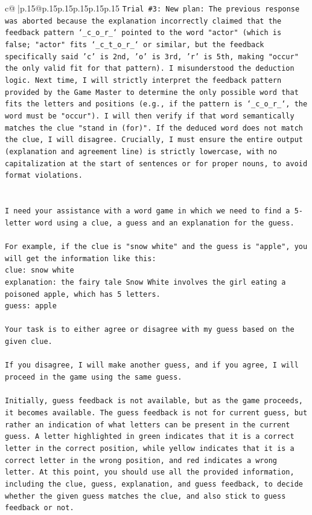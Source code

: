 \documentclass{article}
\begin{document}
{\begin{supertabular}{c@{$\;$}|p{.15\linewidth}@{}p{.15\linewidth}p{.15\linewidth}p{.15\linewidth}p{.15\linewidth}p{.15\linewidth}}
{{{\texttt{Trial \#3: New plan: The previous response was aborted because the explanation incorrectly claimed that the feedback pattern `\_c\_o\_r\_` pointed to the word "actor" (which is false; "actor" fits `\_c\_t\_o\_r\_` or similar, but the feedback specifically said 'c' is 2nd, 'o' is 3rd, 'r' is 5th, making "occur" the only valid fit for that pattern). I misunderstood the deduction logic. Next time, I will strictly interpret the feedback pattern provided by the Game Master to determine the only possible word that fits the letters and positions (e.g., if the pattern is `\_c\_o\_r\_`, the word must be "occur"). I will then verify if that word semantically matches the clue "stand in (for)". If the deduced word does not match the clue, I will disagree. Crucially, I must ensure the entire output (explanation and agreement line) is strictly lowercase, with no capitalization at the start of sentences or for proper nouns, to avoid format violations.} \\
\\ 
\\ 
\texttt{I need your assistance with a word game in which we need to find a 5{-}letter word using a clue, a guess and an explanation for the guess.} \\
\\ 
\texttt{For example, if the clue is "snow white" and the guess is "apple", you will get the information like this:} \\
\texttt{clue: snow white} \\
\texttt{explanation: the fairy tale Snow White involves the girl eating a poisoned apple, which has 5 letters.} \\
\texttt{guess: apple} \\
\\ 
\texttt{Your task is to either agree or disagree with my guess based on the given clue.} \\
\\ 
\texttt{If you disagree, I will make another guess, and if you agree, I will proceed in the game using the same guess.} \\
\\ 
\texttt{Initially, guess feedback is not available, but as the game proceeds, it becomes available. The guess feedback is not for current guess, but rather an indication of what letters can be present in the current guess. A letter highlighted in green indicates that it is a correct letter in the correct position, while yellow indicates that it is a correct letter in the wrong position, and red indicates a wrong letter. At this point, you should use all the provided information, including the clue, guess, explanation, and guess feedback, to decide whether the given guess matches the clue, and also stick to guess feedback or not.} \\
}}}
\end{supertabular}}
\end{document}
